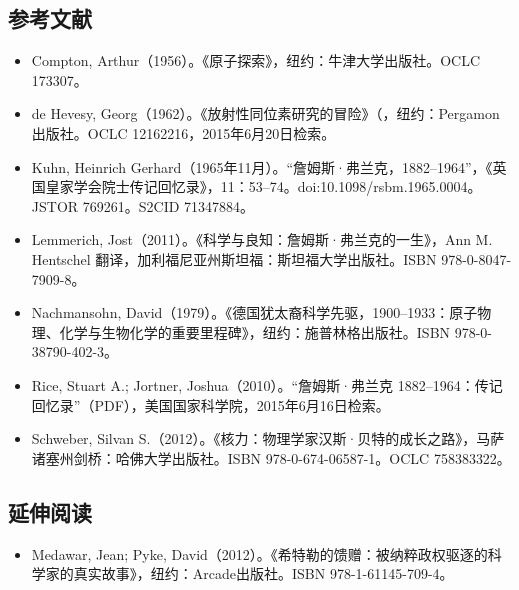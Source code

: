 \subsection{参考文献}
\begin{itemize}
\item Compton, Arthur（1956）。《原子探索》，纽约：牛津大学出版社。OCLC 173307。
\item de Hevesy, Georg（1962）。《放射性同位素研究的冒险》（，纽约：Pergamon出版社。OCLC 12162216，2015年6月20日检索。
\item Kuhn, Heinrich Gerhard（1965年11月）。“詹姆斯·弗兰克，1882–1964”，《英国皇家学会院士传记回忆录》，11：53–74。doi:10.1098/rsbm.1965.0004。JSTOR 769261。S2CID 71347884。
\item Lemmerich, Jost（2011）。《科学与良知：詹姆斯·弗兰克的一生》，Ann M. Hentschel 翻译，加利福尼亚州斯坦福：斯坦福大学出版社。ISBN 978-0-8047-7909-8。
\item Nachmansohn, David（1979）。《德国犹太裔科学先驱，1900–1933：原子物理、化学与生物化学的重要里程碑》，纽约：施普林格出版社。ISBN 978-0-38790-402-3。
\item Rice, Stuart A.; Jortner, Joshua（2010）。“詹姆斯·弗兰克 1882–1964：传记回忆录”（PDF），美国国家科学院，2015年6月16日检索。
\item Schweber, Silvan S.（2012）。《核力：物理学家汉斯·贝特的成长之路》，马萨诸塞州剑桥：哈佛大学出版社。ISBN 978-0-674-06587-1。OCLC 758383322。
\end{itemize}
\subsection{延伸阅读}
\begin{itemize}
\item Medawar, Jean; Pyke, David（2012）。《希特勒的馈赠：被纳粹政权驱逐的科学家的真实故事》，纽约：Arcade出版社。ISBN 978-1-61145-709-4。
\end{itemize}
